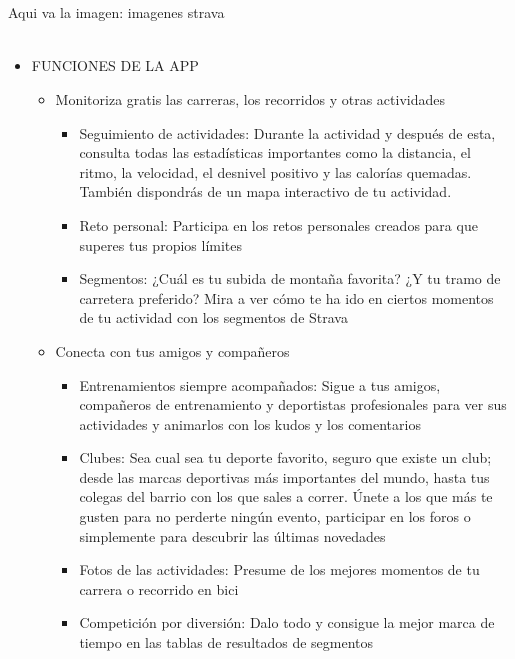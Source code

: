 \documentclass[a4paper, 11pt]{article}
\begin{document}
                      \\\\\textcolor[rgb]{1,0,0}{Aqui va la imagen: imagenes strava}\\\\
                    \begin{itemize}
                      \item{FUNCIONES DE LA APP}
                      \begin{itemize}
                        \item {Monitoriza gratis las carreras, los recorridos y otras actividades}
                        \begin{itemize}
                          \item {Seguimiento de actividades: Durante la actividad y después de esta, consulta todas las estadísticas importantes como la distancia, el ritmo, la velocidad, el desnivel positivo y las calorías quemadas. También dispondrás de un mapa interactivo de tu actividad.}
                          \item {Reto personal: Participa en los retos personales creados para que superes tus propios límites}
                          \item {Segmentos: ¿Cuál es tu subida de montaña favorita? ¿Y tu tramo de carretera preferido? Mira a ver cómo te ha ido en ciertos momentos de tu actividad con los segmentos de Strava}
                        \end{itemize}
                        \item {Conecta con tus amigos y compañeros}
                        \begin{itemize}
                          \item {Entrenamientos siempre acompañados: Sigue a tus amigos, compañeros de entrenamiento y deportistas profesionales para ver sus actividades y animarlos con los kudos y los comentarios}
                          \item {Clubes: Sea cual sea tu deporte favorito, seguro que existe un club; desde las marcas deportivas más importantes del mundo, hasta tus colegas del barrio con los que sales a correr. Únete a los que más te gusten para no perderte ningún evento, participar en los foros o simplemente para descubrir las últimas novedades}
                          \item {Fotos de las actividades: Presume de los mejores momentos de tu carrera o recorrido en bici}
                          \item {Competición por diversión: Dalo todo y consigue la mejor marca de tiempo en las tablas de resultados de segmentos}

\end{itemize}
\end{itemize}
\end{itemize}
\end{document}
